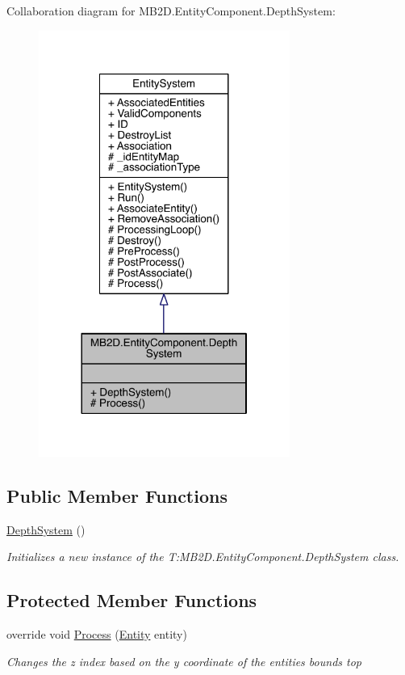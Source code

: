 Collaboration diagram for M\+B2\+D.\+Entity\+Component.\+Depth\+System\+:\nopagebreak
\begin{figure}[H]
\begin{center}
\leavevmode
\includegraphics[width=233pt]{class_m_b2_d_1_1_entity_component_1_1_depth_system__coll__graph}
\end{center}
\end{figure}
\subsection*{Public Member Functions}
\begin{DoxyCompactItemize}
\item 
\hyperlink{class_m_b2_d_1_1_entity_component_1_1_depth_system_a5a7f2fc4d65f99bb89624cbcd1d52d65}{Depth\+System} ()
\begin{DoxyCompactList}\small\item\em Initializes a new instance of the T\+:\+M\+B2\+D.\+Entity\+Component.\+Depth\+System class. \end{DoxyCompactList}\end{DoxyCompactItemize}
\subsection*{Protected Member Functions}
\begin{DoxyCompactItemize}
\item 
override void \hyperlink{class_m_b2_d_1_1_entity_component_1_1_depth_system_a738556bdf819c9c0d4082a323a502c58}{Process} (\hyperlink{class_m_b2_d_1_1_entity_component_1_1_entity}{Entity} entity)
\begin{DoxyCompactList}\small\item\em Changes the z index based on the y coordinate of the entities bounds top \end{DoxyCompactList}\end{DoxyCompactItemize}
